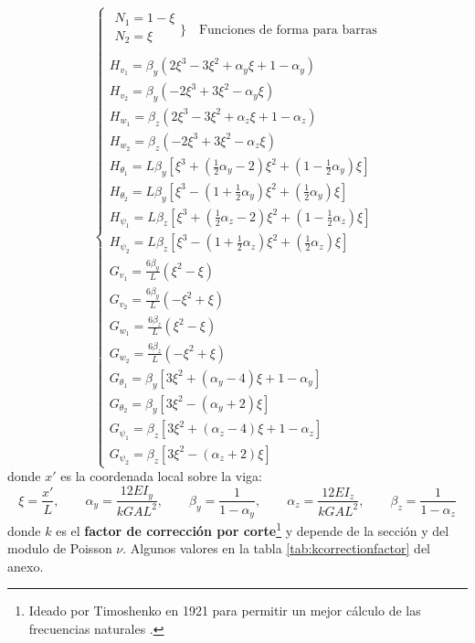 \documentclass[11pt, a4paper,titlepage]{article}
\begin{document}
\[
\begin{cases}
\!\!\!\!\!
\begin{array}{l}
N_{1}=1-\xi \\
N_2 = \xi \\
\end{array}\Bigg\}\quad  \text{Funciones de forma para barras}\\
H_{v_{1}}=\beta_{y}\left(2 \xi^{3}-3 \xi^{2}+\alpha_{y} \xi+1-\alpha_{y}\right)\\
H_{v_{2}}=\beta_{y}\left(-2 \xi^{3}+3 \xi^{2}-\alpha_{y} \xi\right) \\
H_{w_{1}}=\beta_{z}\left(2 \xi^{3}-3 \xi^{2}+\alpha_{z} \xi+1-\alpha_{z}\right) \\
H_{w_{2}}=\beta_{z}\left(-2 \xi^{3}+3 \xi^{2}-\alpha_{z} \xi\right)\\
H_{\theta_{1}}=L \beta_{y}\left[\xi^{3}+\left(\frac{1}{2} \alpha_{y}-2\right) \xi^{2}+\left(1-\frac{1}{2} \alpha_{y}\right) \xi\right] \\
H_{\theta_{2}}=L \beta_{y}\left[\xi^{3}-\left(1+\frac{1}{2} \alpha_{y}\right) \xi^{2}+\left(\frac{1}{2} \alpha_{y}\right) \xi\right] \\
H_{\psi_{1}}=L \beta_{z}\left[\xi^{3}+\left(\frac{1}{2} \alpha_{z}-2\right) \xi^{2}+\left(1-\frac{1}{2} \alpha_{z}\right) \xi\right] \\
H_{\psi_{2}}=L \beta_{z}\left[\xi^{3}-\left(1+\frac{1}{2} \alpha_{z}\right) \xi^{2}+\left(\frac{1}{2} \alpha_{z}\right) \xi\right] \\
G_{v_{1}}=\frac{6 \beta_{y}}{L}\left(\xi^{2}-\xi\right) \\
G_{v_{2}}=\frac{6 \beta_{y}}{L}\left(-\xi^{2}+\xi\right) \\
G_{w_{1}}=\frac{6 \beta_{z}}{L}\left(\xi^{2}-\xi\right) \\
G_{w_{2}}=\frac{6 \beta_{z}}{L}\left(-\xi^{2}+\xi\right) \\
G_{\theta_{1}}=\beta_{y}\left[3 \xi^{2}+\left(\alpha_{y}-4\right) \xi+1-\alpha_{y}\right] \\
G_{\theta_{2}}=\beta_{y}\left[3 \xi^{2}-\left(\alpha_{y}+2\right) \xi\right] \\
G_{\psi_{1}}=\beta_{z}\left[3 \xi^{2}+\left(\alpha_{z}-4\right) \xi+1-\alpha_{z}\right] \\
G_{\psi_{2}}=\beta_{z}\left[3 \xi^{2}-\left(\alpha_{z}+2\right) \xi\right]
\end{cases}
\]
donde $x'$ es la coordenada local sobre la viga:
\[
\xi=\frac{x'}{L}, \qquad \alpha_{y}=\frac{12 E I_{y}}{k G A L^{2}}, \qquad \beta_{y}=\frac{1}{1-\alpha_{y}}, \qquad \alpha_{z}=\frac{12 E I_{z}}{k G A L^{2}},\qquad \beta_{z}=\frac{1}{1-\alpha_{z}}
\]
donde $k$ es el \textbf{factor de corrección por corte}\footnote{Ideado por Timoshenko en 1921 para permitir un mejor cálculo de las frecuencias naturales \cite{dong2010much}.} y depende de la sección y del modulo de Poisson $\nu$. Algunos valores en la tabla \ref{tab:kcorrectionfactor} del anexo.
\end{document}
